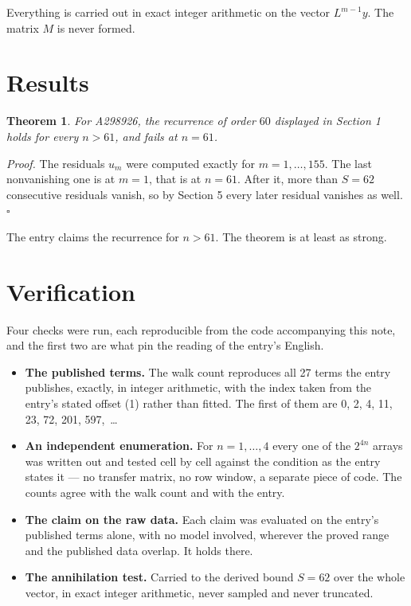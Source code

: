 \documentclass[11pt]{article}
\newtheorem{theorem}{Theorem}
\theoremstyle{definition}
\begin{document}
Everything is carried out in exact integer arithmetic on the vector $L^{m-1}y$. The matrix $M$ is never formed.

\section{Results}

\begin{theorem} For A298926, the recurrence of order $60$ displayed in Section 1 holds for every $n > 61$, and fails at $n = 61$.\end{theorem}

{\itshape Proof.} The residuals $u_m$ were computed exactly for $m = 1,\dots,155$. The last nonvanishing one is at $m = 1$, that is at $n = 61$. After it, more than $S = 62$ consecutive residuals vanish, so by Section 5 every later residual vanishes as well. $\square$

The entry claims the recurrence for $n > 61$. The theorem is at least as strong.

\section{Verification}

Four checks were run, each reproducible from the code accompanying this note, and the first two are what pin the reading of the entry's English.

\begin{itemize}

\item {\bfseries The published terms.} The walk count reproduces all 27 terms the entry publishes, exactly, in integer arithmetic, with the index taken from the entry's stated offset (1) rather than fitted. The first of them are 0, 2, 4, 11, 23, 72, 201, 597,~\dots

\item {\bfseries An independent enumeration.} For $n = 1,\dots,4$ every one of the $2^{4n}$ arrays was written out and tested cell by cell against the condition as the entry states it --- no transfer matrix, no row window, a separate piece of code. The counts agree with the walk count and with the entry.

\item {\bfseries The claim on the raw data.} Each claim was evaluated on the entry's published terms alone, with no model involved, wherever the proved range and the published data overlap. It holds there.

\item {\bfseries The annihilation test.} Carried to the derived bound $S = 62$ over the whole vector, in exact integer arithmetic, never sampled and never truncated.

\end{itemize}
\end{document}
